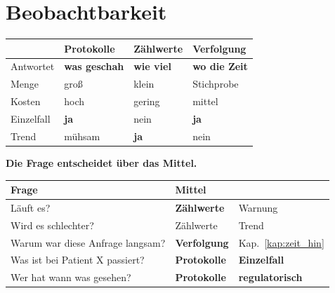 \chapter{Beobachtbarkeit}\label{kap:beobachtbarkeit}

\begin{merksatz}
\begin{center}
{\small
\renewcommand{\arraystretch}{1.5}
\begin{tabular}{@{}P{2.4cm}P{2.4cm}P{2.4cm}P{1.8cm}@{}}
\toprule
& \textbf{Protokolle} & \textbf{Zählwerte} & \textbf{Verfolgung}\\
\midrule
Antwortet & \textbf{was geschah} & \textbf{wie viel} & \textbf{wo die Zeit}\\
Menge & \textcolor{akzent}{groß} & \textcolor{gruen}{klein} & \textcolor{mittel}{Stichprobe}\\
Kosten & \textcolor{akzent}{hoch} & \textcolor{gruen}{gering} & \textcolor{mittel}{mittel}\\
Einzelfall & \textcolor{gruen}{\textbf{ja}} & \textcolor{akzent}{nein} & \textcolor{gruen}{\textbf{ja}}\\
Trend & \textcolor{akzent}{mühsam} & \textcolor{gruen}{\textbf{ja}} & \textcolor{akzent}{nein}\\
\bottomrule
\end{tabular}}
\end{center}

\begin{center}
\begin{minipage}{0.88\textwidth}
\end{minipage}
\end{center}

\textbf{Die Frage entscheidet über das Mittel.}

\begin{center}
{\small
\renewcommand{\arraystretch}{1.45}
\begin{tabular}{@{}P{3.2cm}P{2.4cm}P{2.4cm}@{}}
\toprule
\textbf{Frage} & \textbf{Mittel} & \\
\midrule
Läuft es? & \textbf{Zählwerte} & \textcolor{gruen}{Warnung}\\
Wird es schlechter? & Zählwerte & \textcolor{gruen}{Trend}\\
Warum war diese Anfrage langsam? & \textbf{Verfolgung} & \textcolor{gruen}{Kap.~\ref{kap:zeit_hin}}\\
Was ist bei Patient X passiert? & \textbf{Protokolle} & \textcolor{gruen}{\textbf{Einzelfall}}\\
Wer hat wann was gesehen? & \textbf{Protokolle} & \textcolor{gruen}{\textbf{regulatorisch}}\\
\bottomrule
\end{tabular}}
\end{center}


\end{merksatz}
